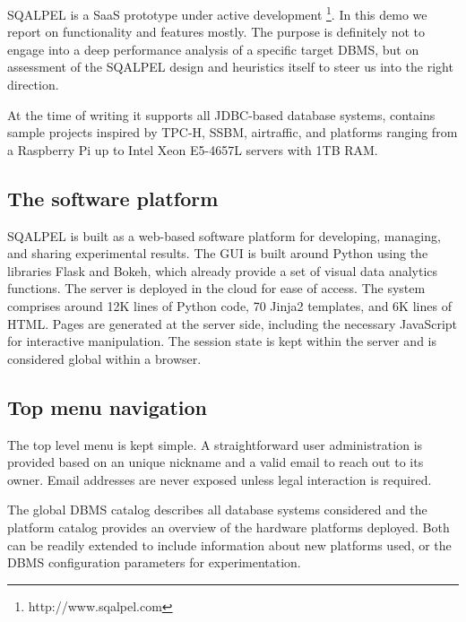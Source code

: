\documentclass{cidr-2019}
\begin{document}
{\sc SQALPEL} is a SaaS prototype under active
development \footnote{http://www.sqalpel.com }. In this demo we
report on functionality and features mostly. The purpose is definitely
not to engage into a deep performance analysis of a specific target
DBMS, but on assessment of the {\sc SQALPEL} design and heuristics
itself to steer us into the right direction.

At the time of writing it supports all JDBC-based database systems,
contains sample projects inspired by TPC-H, SSBM, airtraffic, and
platforms ranging from a Raspberry Pi up to Intel Xeon E5-4657L
servers with 1TB RAM.


\subsection{The software platform}\label{GUI}
{\sc SQALPEL} is built as a web-based software platform
for developing, managing, and sharing experimental results. The GUI is
built around Python using the libraries Flask and Bokeh, which already
provide a set of visual data analytics functions. The server is
deployed in the cloud for ease of access. The system comprises around
12K lines of Python code, 70 Jinja2 templates, and 6K lines of HTML.
Pages are generated at the server side, including the necessary
JavaScript for interactive manipulation.
The session state is kept within the server and is considered global
within a browser.

\subsection{Top menu navigation}
The top level menu is kept simple. A straightforward user
administration is provided based on an unique nickname and a valid
email to reach out to its owner. Email addresses are never exposed
unless legal interaction is required.


The global DBMS catalog describes all database systems considered and
the platform catalog provides an overview of the hardware platforms
deployed. Both can be readily extended to include information about
new platforms used, or the DBMS configuration parameters for
experimentation.
\end{document}
